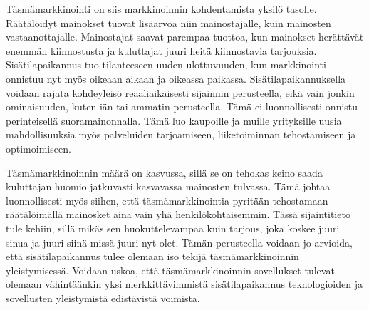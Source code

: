 Täsmämarkkinointi on siis markkinoinnin kohdentamista yksilö tasolle. Räätälöidyt mainokset tuovat lisäarvoa niin mainostajalle, kuin mainosten vastaanottajalle. Mainostajat saavat parempaa tuottoa, kun mainokset herättävät enemmän kiinnostusta ja kuluttajat juuri heitä kiinnostavia tarjouksia. Sisätilapaikannus tuo tilanteeseen uuden ulottuvuuden, kun markkinointi onnistuu nyt myös oikeaan aikaan ja oikeassa paikassa. Sisätilapaikannuksella voidaan rajata kohdeyleisö reaaliaikaisesti sijainnin perusteella, eikä vain jonkin ominaisuuden, kuten iän tai ammatin perusteella. Tämä ei luonnollisesti onnistu perinteisellä suoramainonnalla. Tämä luo kaupoille ja muille yrityksille uusia mahdollisuuksia myös palveluiden tarjoamiseen, liiketoiminnan tehostamiseen ja optimoimiseen.  

Täsmämarkkinoinnin määrä on kasvussa, sillä se on tehokas keino saada kuluttajan huomio jatkuvasti kasvavassa mainosten tulvassa. Tämä johtaa luonnollisesti myös siihen, että täsmämarkkinointia pyritään tehostamaan räätälöimällä mainosket aina vain yhä henkilökohtaisemmin. Tässä sijaintitieto tule kehiin, sillä mikäs sen huokuttelevampaa kuin tarjous, joka koskee juuri sinua ja juuri siinä missä juuri nyt olet. Tämän perusteella voidaan jo arvioida, että sisätilapaikannus tulee olemaan iso tekijä täsmämarkkinoinnin yleistymisessä. Voidaan uskoa, että täsmämarkkinoinnin sovellukset tulevat olemaan vähintäänkin yksi merkkittävimmistä sisätilapaikannus teknologioiden ja sovellusten yleistymistä edistävistä voimista.